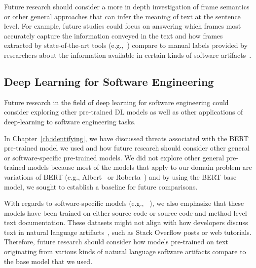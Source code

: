 Future research should consider
a more in depth investigation of 
frame semantics or other general approaches that can infer the meaning of text at the sentence level. 
For example, future studies could focus on answering 
which frames most accurately capture the information conveyed in the text 
and how frames extracted by state-of-the-art tools (e.g.,~\cite{swayamdipta17, chen2021joint})
compare to manual labels provided by researchers 
about the information available in certain kinds of software artifacts~\cite{Maalej2013, Arya2019, Sorbo2015}.  



 






\subsection{Deep Learning for Software Engineering}
\label{cp7:deep-learning}



Future research in the field of deep learning for software engineering could consider 
exploring other pre-trained \acs{DL} models as well as other applications of 
deep-learning to software engineering tasks. 




In Chapter~\ref{ch:identifying}, we have discussed threats associated with the BERT pre-trained model 
we used and how future research should consider other 
general or software-specific pre-trained models.
We did not explore other general pre-trained models because most of the models that apply to our domain problem 
are variations of BERT (e.g., Albert~\cite{lan2019albert} or Roberta~\cite{liu2019roberta})
and by using the BERT base model, we sought to establish a baseline for future comparisons.




With regards to software-specific models (e.g., ~\cite{feng2020-codebert, li2019neural}), we also emphasize 
that these models have been trained on either source code or source code and method level text documentation. 
These datasets might not align with how developers discuss text in natural language artifacts~\cite{arya2020}, such 
as Stack Overflow posts or web tutorials. Therefore, future research should consider how 
 models pre-trained on text originating from various kinds of 
natural language software artifacts compare to the base model that we used.





